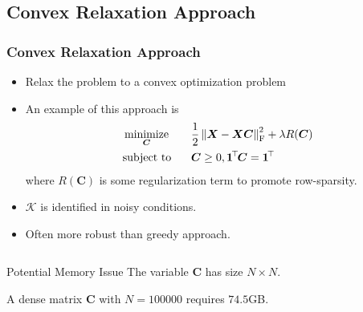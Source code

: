 \documentclass[10pt,xcolor={usenames,dvipsnames,table}]{beamer}
\def\blue{\color{blue}}
\newcommand{\norm}[1]{\left\lVert#1\right\rVert}
\newcommand{\T}{\!\top\!}
\DeclareMathOperator*{\minimize}{minimize}
\newcommand{\citep}[1]{{\blue \scriptsize \parencite{#1}}}
\begin{document}
\subsection{Convex Relaxation Approach}%
\label{sub:convex_relaxation_approach}


\begin{frame}
    \frametitle{Convex Relaxation Approach}
    \begin{itemize}
        \item Relax the problem to a convex optimization problem \citep{gillis2018afast,gillis2014robust,gillis2013robustness,recht2012factoring,Elhamifar2012,Ammanouil2014blind}
        \item An example of this approach is \citep{esser2012convex,fu2015robust,gillis2018afast}
    \begin{alignat*}{2}
        & \minimize_{\bm{C}} \quad && \dfrac{1}{2} \norm{\bm{X} - \bm{X}\bm{C}}_{\rm F}^2 + \lambda R(\bm{C}) \\
        & \text{\rm subject to} && \bm{C} \geq 0, \bm{1}^{\T}\bm{C} = \bm{1}^{\T}
    \end{alignat*}
    where $R(\bm{C})$ is some regularization term to promote row-sparsity.
\item $\mathcal{K}$ is identified in noisy conditions.
\item Often more robust than greedy approach.
    \end{itemize}

    \begin{columns}
        \begin{column}{0.6\textwidth}
        \begin{alertblock}{Potential Memory Issue}
            The variable $\bm{C}$ has size $N \times N$.
        \end{alertblock}
        A dense matrix $\bm{C}$ with $N=100000$ requires  $74.5$GB.


\end{column}
\end{columns}
\end{frame}
\end{document}
